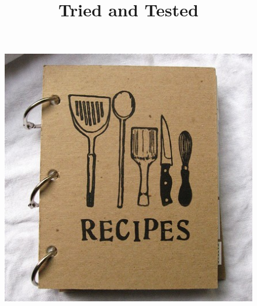 \documentclass[12pt,a4paper,notitlepage]{report}
\begin{document}
\newcommand{\newrecipe}[2] {%
	\newpage
	\phantomsection
	\addcontentsline{toc}{section}{#1}
	\section*{
	\center {\Huge \href{#2}{#1}}
	}
}

\newenvironment{ingredients-list}{
  \begin{itemize}
  \setlength{\itemsep}{1pt}
  \setlength{\parskip}{0pt}
  \setlength{\parsep}{0pt}
}{
  \end{itemize}
}


\title{Tried and Tested}
\date{}
\author{}
\maketitle
\begin{figure}[h!]
\centering
\includegraphics[scale=1]{./img/recipe-book.jpg}
\end{figure}
\thispagestyle{empty}
\newpage

\hypertarget{contents}{}%
\hypersetup{
  colorlinks,
  linkcolor=blue,
  linktoc=all
}
\tableofcontents











\end{document}
